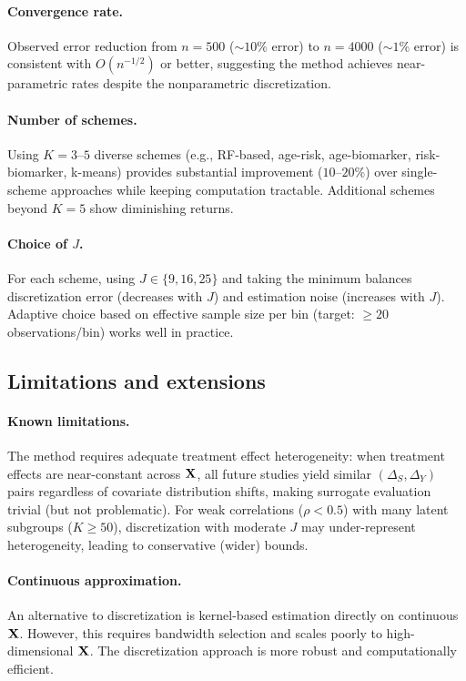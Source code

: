 \documentclass{article}
\begin{document}
\paragraph{Convergence rate.}
Observed error reduction from $n = 500$ ($\sim 10\%$ error) to $n = 4000$ ($\sim 1\%$ error) is consistent with $O(n^{-1/2})$ or better, suggesting the method achieves near-parametric rates despite the nonparametric discretization.

\paragraph{Number of schemes.}
Using $K = 3$--$5$ diverse schemes (e.g., RF-based, age-risk, age-biomarker, risk-biomarker, k-means) provides substantial improvement ($10$--$20\%$) over single-scheme approaches while keeping computation tractable. Additional schemes beyond $K = 5$ show diminishing returns.

\paragraph{Choice of $J$.}
For each scheme, using $J \in \{9, 16, 25\}$ and taking the minimum balances discretization error (decreases with $J$) and estimation noise (increases with $J$). Adaptive choice based on effective sample size per bin (target: $\geq 20$ observations/bin) works well in practice.

\subsection{Limitations and extensions}

\paragraph{Known limitations.}
The method requires adequate treatment effect heterogeneity: when treatment effects are near-constant across $\mathbf{X}$, all future studies yield similar $(\Delta_S, \Delta_Y)$ pairs regardless of covariate distribution shifts, making surrogate evaluation trivial (but not problematic). For weak correlations ($\rho < 0.5$) with many latent subgroups ($K \geq 50$), discretization with moderate $J$ may under-represent heterogeneity, leading to conservative (wider) bounds.

\paragraph{Continuous approximation.}
An alternative to discretization is kernel-based estimation directly on continuous $\mathbf{X}$. However, this requires bandwidth selection and scales poorly to high-dimensional $\mathbf{X}$. The discretization approach is more robust and computationally efficient.
\end{document}
